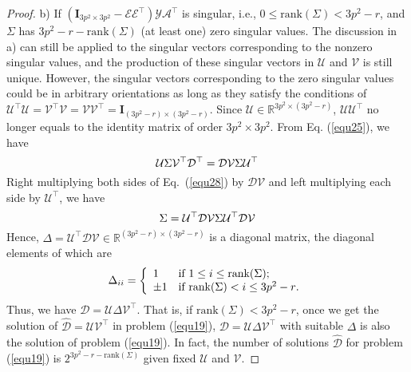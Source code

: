 \begin{proof}
b) If $(\bm{I}_{3p^2\times 3p^2}-\mathcal{E}\mathcal{E}^{\top})\mathcal{Y}\mathcal{A}^{\top}$ is singular, i.e.,  $0\le \text{rank}(\Sigma)< 3p^2-r$, and $\Sigma$ has $3p^2-r-\text{rank}(\Sigma)$ (at least one) zero singular values. The discussion in a) can still be applied to the singular vectors corresponding to the nonzero singular values, and the production of these singular vectors in $\mathcal{U}$ and $\mathcal{V}$ is still unique. However, the singular vectors corresponding to the zero singular values could be in arbitrary orientations as long as they satisfy the conditions of $\mathcal{U}^{\top}\mathcal{U}=\mathcal{V}^{\top}\mathcal{V}=\mathcal{V}\mathcal{V}^{\top}=\bm{I}_{(3p^2-r)\times (3p^2-r)}$. Since $\mathcal{U}\in \mathbb{R}^{3p^2\times (3p^2-r)}$, $\mathcal{U}\mathcal{U}^{\top}$ no longer equals to the identity matrix of order $3p^2\times 3p^2$. From Eq. (\ref{equ25}), we have
\begin{equation}\label{equ28}
\mathcal{U}\Sigma\mathcal{V}^{\top}\mathcal{D}^{\top}
=
\mathcal{D}\mathcal{V}\Sigma\mathcal{U}^{\top}
\vspace{-2mm}
\end{equation}
Right multiplying both sides of Eq.\ (\ref{equ28}) by $\mathcal{D}\mathcal{V}$ and left multiplying each side by $\mathcal{U}^{\top}$, we have
\vspace{-2mm}
\begin{equation}\label{equ29}
\Sigma
=
\mathcal{U}^{\top}\mathcal{D}\mathcal{V}\Sigma\mathcal{U}^{\top}\mathcal{D}\mathcal{V}
\vspace{-2mm}
\end{equation}
Hence, $\Delta=\mathcal{U}^{\top}\mathcal{D}\mathcal{V}\in\mathbb{R}^{(3p^2-r)\times (3p^2-r)}$ is a diagonal matrix, the diagonal elements of which are 
\vspace{-1mm}
\begin{displaymath}
\Delta_{ii}= \left\{ \begin{array}{ll}
1 & \textrm{if $1\le i\le \text{rank}(\Sigma)$};\\
\pm 1 & \textrm{if $\text{rank}(\Sigma)< i \le 3p^2-r$}.\\
\end{array} \right.
\vspace{-1mm}
\end{displaymath}
Thus, we have $\mathcal{D}=\mathcal{U}\Delta\mathcal{V}^{\top}$. That is, if $\text{rank}(\Sigma)<3p^2-r$, once we get the solution of $\hat{\mathcal{D}}=\mathcal{U}\mathcal{V}^{\top}$ in problem (\ref{equ19}), $\mathcal{D}=\mathcal{U}\Delta\mathcal{V}^{\top}$ with suitable $\Delta$ is also the solution of problem (\ref{equ19}). In fact, the number of solutions $\hat{\mathcal{D}}$ for problem (\ref{equ19}) is $2^{3p^2-r-\text{rank}(\Sigma)}$ given fixed $\mathcal{U}$ and $\mathcal{V}$.
\end{proof}